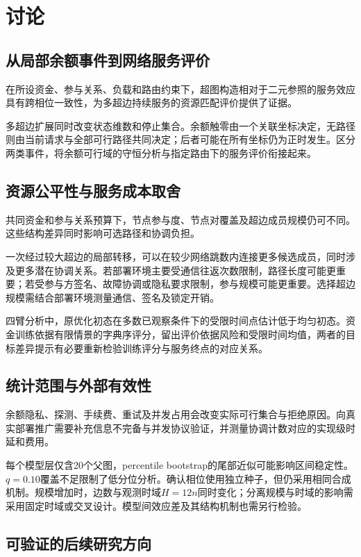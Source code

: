 \documentclass[UTF8,a4paper,twocolumn,fontset=none,zihao=5]{ctexart}
\begin{document}
\section{讨论}

\subsection{从局部余额事件到网络服务评价}

在所设资金、参与关系、负载和路由约束下，超图构造相对于二元参照的服务效应具有跨相位一致性，为多超边持续服务的资源匹配评价提供了证据。


多超边扩展同时改变状态维数和停止集合。余额触零由一个关联坐标决定，无路径则由当前请求与全部可行路径共同决定；后者可能在所有坐标仍为正时发生。区分两类事件，将余额可行域的守恒分析与指定路由下的服务评价衔接起来。


\subsection{资源公平性与服务成本取舍}

共同资金和参与关系预算下，节点参与度、节点对覆盖及超边成员规模仍可不同。这些结构差异同时影响可选路径和协调负担。


一次经过较大超边的局部转移，可以在较少网络跳数内连接更多候选成员，同时涉及更多潜在协调关系。若部署环境主要受通信往返次数限制，路径长度可能更重要；若受参与方签名、故障协调或隐私要求限制，参与规模可能更重要。选择超边规模需结合部署环境测量通信、签名及锁定开销。


四臂分析中，原优化初态在多数已观察条件下的受限时间点估计低于均匀初态。资金训练依据有限情景的字典序评分，留出评价依据风险和受限时间均值，两者的目标差异提示有必要重新检验训练评分与服务终点的对应关系。

\subsection{统计范围与外部有效性}

余额隐私、探测、手续费、重试及并发占用会改变实际可行集合与拒绝原因。向真实部署推广需要补充信息不完备与并发协议验证，并测量协调计数对应的实现级时延和费用。


每个模型层仅含20个父图，percentile bootstrap的尾部近似可能影响区间稳定性。$q=0.10$覆盖不足限制了低分位分析。确认相位使用独立种子，但仍采用相同合成机制。规模增加时，边数与观测时域$H=12n$同时变化；分离规模与时域的影响需采用固定时域或交叉设计。模型间效应差及其结构机制也需另行检验。


\subsection{可验证的后续研究方向}
\end{document}
